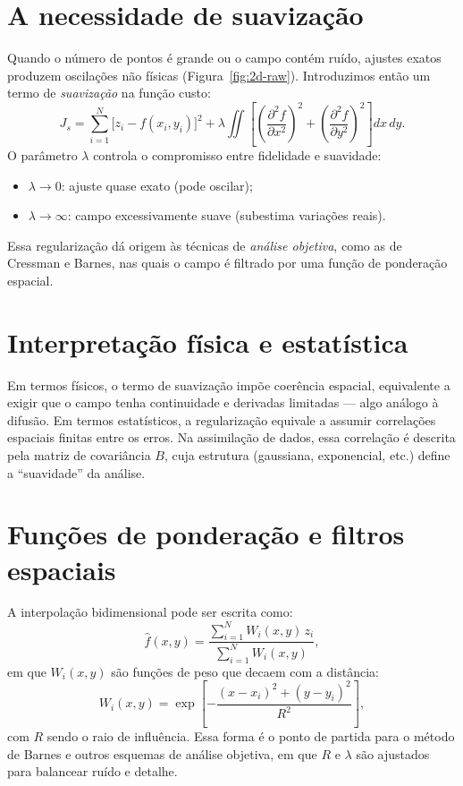 \section{A necessidade de suavização}
Quando o número de pontos é grande ou o campo contém ruído, ajustes exatos produzem oscilações não físicas (Figura~\ref{fig:2d-raw}).  
Introduzimos então um termo de \emph{suavização} na função custo:
\begin{equation}
J_s = \sum_{i=1}^{N} \big[z_i - f(x_i,y_i)\big]^2
+ \lambda \iint \left[ \left(\frac{\partial^2 f}{\partial x^2}\right)^2
+ \left(\frac{\partial^2 f}{\partial y^2}\right)^2 \right] dx\,dy.
\label{eq:smooth-cost}
\end{equation}
O parâmetro $\lambda$ controla o compromisso entre fidelidade e suavidade:
\begin{itemize}
  \item $\lambda \to 0$: ajuste quase exato (pode oscilar);
  \item $\lambda \to \infty$: campo excessivamente suave (subestima variações reais).
\end{itemize}
Essa regularização dá origem às técnicas de \emph{análise objetiva}, como as de Cressman e Barnes, nas quais o campo é filtrado por uma função de ponderação espacial.

\section{Interpretação física e estatística}
Em termos físicos, o termo de suavização impõe coerência espacial, equivalente a exigir que o campo tenha continuidade e derivadas limitadas — algo análogo à difusão.  
Em termos estatísticos, a regularização equivale a assumir correlações espaciais finitas entre os erros.  
Na assimilação de dados, essa correlação é descrita pela matriz de covariância $B$, cuja estrutura (gaussiana, exponencial, etc.) define a “suavidade” da análise.

\section{Funções de ponderação e filtros espaciais}
A interpolação bidimensional pode ser escrita como:
\begin{equation}
\hat{f}(x,y) = \frac{\displaystyle \sum_{i=1}^{N} W_i(x,y)\, z_i}
                     {\displaystyle \sum_{i=1}^{N} W_i(x,y)},
\label{eq:weighted2d}
\end{equation}
em que $W_i(x,y)$ são funções de peso que decaem com a distância:
\[
W_i(x,y) = \exp\!\left[-\frac{(x-x_i)^2 + (y-y_i)^2}{R^2}\right],
\]
com $R$ sendo o raio de influência.  
Essa forma é o ponto de partida para o método de Barnes e outros esquemas de análise objetiva, em que $R$ e $\lambda$ são ajustados para balancear ruído e detalhe.

